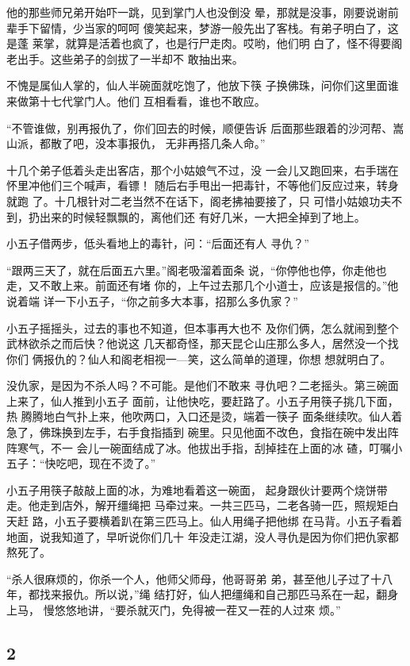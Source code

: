 他的那些师兄弟开始吓一跳，见到掌门人也没倒没
晕，那就是没事，刚要说谢前辈手下留情，少当家的呵呵
傻笑起来，梦游一般先出了客栈。有弟子明白了，这是蓬
莱掌，就算是活着也疯了，也是行尸走肉。哎哟，他们明
白了，怪不得要阁老出手。这些弟子的剑拔了一半却不
敢抽出来。

不愧是属仙人掌的，仙人半碗面就吃饱了，他放下筷
子换佛珠，问你们这里面谁来做第十七代掌门人。他们
互相看看，谁也不敢应。

“不管谁做，别再报仇了，你们回去的时候，顺便告诉
后面那些跟着的沙河帮、嵩山派，都散了吧，没本事报仇，
无非再搭几条人命。”

十几个弟子低着头走出客店，那个小姑娘气不过，没
一会儿又跑回来，右手瑞在怀里冲他们三个喊声，看镖！
随后右手甩出一把毒针，不等他们反应过来，转身就跑
了。十几根针对二老当然不在话下，阁老拂袖要接了，只
可惜小姑娘功夫不到，扔出来的时候轻飘飘的，离他们还
有好几米，一大把全掉到了地上。

小五子借两步，低头看地上的毒针，问：“后面还有人
寻仇？”

“跟两三天了，就在后面五六里。”阁老吸溜着面条
说，“你停他也停，你走他也走，又不敢上来。前面还有堵
你的，上午过去那几个小道士，应该是报信的。”他说着端
详一下小五子，“你之前多大本事，招那么多仇家？”

小五子摇摇头，过去的事也不知道，但本事再大也不
及你们俩，怎么就闹到整个武林欲杀之而后快？他说这
几天都奇怪，那天昆仑山庄那么多人，居然没一个找你们
俩报仇的？仙人和阁老相视一—笑，这么简单的道理，你想
想就明白了。

没仇家，是因为不杀人吗？不可能。是他们不敢来
寻仇吧？二老摇头。第三碗面上来了，仙人推到小五子
面前，让他快吃，要赶路了。小五子用筷子挑几下面，热
腾腾地白气扑上来，他吹两口，入口还是烫，端着一筷子
面条继续吹。仙人着急了，佛珠换到左手，右手食指插到
碗里。只见他面不改色，食指在碗中发出阵阵寒气，不一
会儿一碗面结成了冰。他拔出手指，刮掉挂在上面的冰
碴，叮嘱小五子：“快吃吧，现在不烫了。”

小五子用筷子敲敲上面的冰，为难地看着这一碗面，
起身跟伙计要两个烧饼带走。他走到店外，解开缰绳把
马牵过来。一共三匹马，二老各骑一匹，照规矩白天赶
路，小五子要横着趴在第三匹马上。仙人用绳子把他绑
在马背。小五子看着地面，说我知道了，早听说你们几十
年没走江湖，没人寻仇是因为你们把仇家都熬死了。

“杀人很麻烦的，你杀一个人，他师父师母，他哥哥弟
弟，甚至他儿子过了十八年，都找来报仇。所以说，”绳
结打好，仙人把缰绳和自己那匹马系在一起，翻身上马，
慢悠悠地讲，“要杀就灭门，免得被一茬又一茬的人过來
烦。”
\newline

{\centering\subsection{2}}

